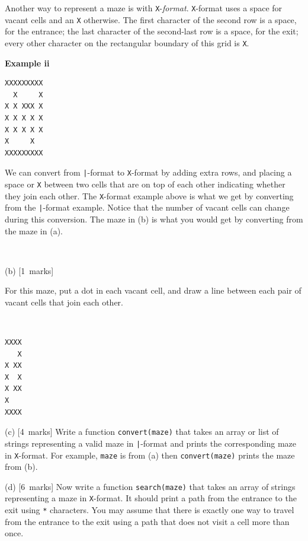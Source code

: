 \documentclass[12pt]{article}
\newcommand{\mymarks}[1]{\mbox{\small [#1 marks]}}
\begin{document}
Another way to represent a maze is with \verb&X&-{\em format}.
\verb&X&-format uses a space for vacant cells and an \verb&X& otherwise.
The first character of the second row is a space,
for the entrance; 
the last character of the second-last row is a space, for the exit;
every other character on the rectangular boundary 
of this grid is \verb&X&.

\noindent
\begin{minipage}[c]{3cm}
{\bf Example ii}
\end{minipage}
\begin{minipage}[c]{10cm}
{\small\begin{verbatim}
XXXXXXXXX
  X     X
X X XXX X
X X X X X
X X X X X
X     X  
XXXXXXXXX

\end{verbatim}}
\end{minipage}

We can convert from \verb&|&-format to \verb&X&-format 
by adding extra rows, and placing a space or \verb&X&
between two cells that are on top of each other indicating 
whether they join each other.
The \verb&X&-format example above is what we get by converting from the \verb&|&-format example.
Notice that the number of vacant cells can change during this conversion.
The maze in (b) is what you would get by converting from
the maze in (a).

~

\noindent
(b) \mymarks{1} ~ ~
\begin{minipage}[c]{11cm}
For this maze, put a dot in each vacant cell,
and draw a line between each pair of vacant cells that join
each other.
\end{minipage} ~ ~
\begin{minipage}[c]{3cm}
{\small\begin{verbatim}
XXXX
   X
X XX
X  X
X XX
X  
XXXX
\end{verbatim}}
\end{minipage}

(c) \mymarks{4}
Write a function \texttt{convert(maze)} that takes an array or list of strings representing a valid maze in \verb&|&-format and 
prints the corresponding maze in \verb&X&-format. 
For example, \texttt{maze} is from (a) then
\texttt{convert(maze)} prints the maze from (b).

\vfill

(d) \mymarks{6}
Now write a function \verb&search(maze)& 
that takes an array of strings representing a maze in \verb&X&-format.
It should print a path from the entrance to the exit using 
\verb&*& characters. 
You may assume that there is exactly one way to travel from the entrance
to the exit using a path that does not visit a cell more than once.
\end{document}
